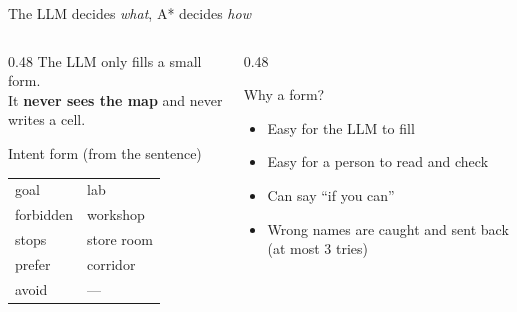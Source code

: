 \documentclass[aspectratio=169]{beamer}
\begin{document}
\begin{frame}{The LLM decides \emph{what}, A* decides \emph{how}}
  \begin{columns}[c]
    \begin{column}{0.48\textwidth}
      The LLM only fills a small form.\\
      It \textbf{never sees the map} and never writes a cell.
      \vspace{0.8em}
      \begin{exampleblock}{Intent form (from the sentence)}
        \small
        \begin{tabular}{@{}ll}
          goal      & lab \\
          forbidden & workshop \\
          stops     & store room \\
          prefer    & corridor \\
          avoid     & --- \\
        \end{tabular}
      \end{exampleblock}
    \end{column}
    \begin{column}{0.48\textwidth}
      \begin{block}{Why a form?}
        \begin{itemize}
          \item Easy for the LLM to fill
          \item Easy for a person to read and check
          \item Can say ``if you can''
          \item Wrong names are caught and sent back
            (at most 3 tries)
        \end{itemize}
      \end{block}
    \end{column}
  \end{columns}
\end{frame}
\end{document}
